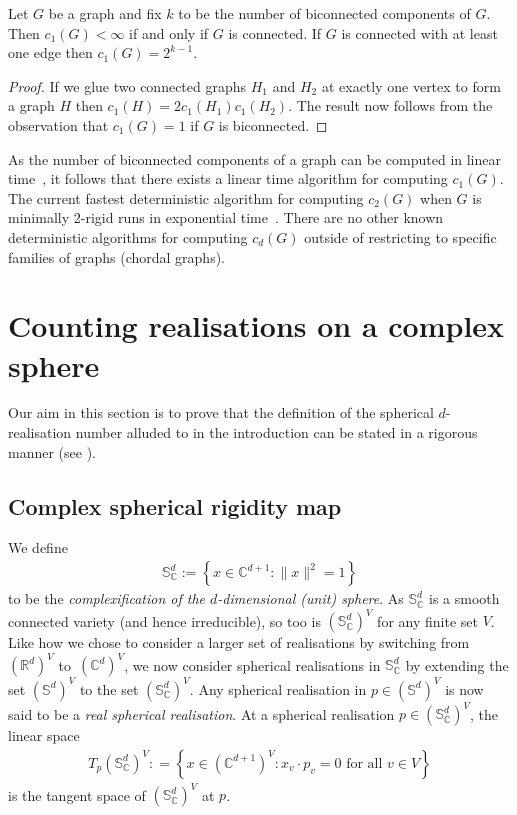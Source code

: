 \begin{proposition}\label{p:1d}
	Let $G$ be a graph and fix $k$ to be the number of biconnected components of $G$.
	Then $c_1(G) < \infty$ if and only if $G$ is connected.
	If $G$ is connected with at least one edge then $c_1(G) = 2^{k-1}$.
\end{proposition}

\begin{proof}
	If we glue two connected graphs $H_1$ and $H_2$ at exactly one vertex to form a graph $H$ then $c_1(H) = 2c_1(H_1)c_1(H_2)$.
	The result now follows from the observation that $c_1(G) = 1$ if $G$ is biconnected.
\end{proof}

As the number of biconnected components of a graph can be computed in linear time~\cite{HopcroftTarjan}, it follows that there exists a linear time algorithm for computing $c_1(G)$.
The current fastest deterministic algorithm for computing $c_2(G)$ when $G$ is minimally 2-rigid runs in exponential time~\cite{PlaneCount}.
There are no other known deterministic algorithms for computing $c_d(G)$ outside of restricting to specific families of graphs (\eg chordal graphs).




\section{Counting realisations on a complex sphere}\label{sec:countsphere}

Our aim in this section is to prove that the definition of the spherical $d$-realisation number alluded to in the introduction can be stated in a rigorous manner (see ).

\subsection{Complex spherical rigidity map}

We define
\begin{align*}
	\mathbb{S}_{\mathbb{C}}^d := \left\{ x \in \mathbb{C}^{d+1} : \|x\|^2=1 \right\}
\end{align*}
to be the \emph{complexification of the $d$-dimensional (unit) sphere}.
As $\mathbb{S}_{\mathbb{C}}^d$ is a smooth connected variety (and hence irreducible),
so too is $(\mathbb{S}_{\mathbb{C}}^{d})^V$ for any finite set $V$.
Like how we chose to consider a larger set of realisations by switching from $(\mathbb{R}^d)^V$ to~$(\mathbb{C}^d)^V$,
we now consider spherical realisations in $\mathbb{S}_\mathbb{C}^d$ by extending the set $(\mathbb{S}^d)^V$ to the set $(\mathbb{S}_{\mathbb{C}}^d)^V$.
Any spherical realisation in $p \in (\mathbb{S}^d)^V$ is now said to be a \emph{real spherical realisation}.
At a spherical realisation $p \in (\mathbb{S}_{\mathbb{C}}^{d})^{V}$,
the linear space
\begin{align*}
	T_p (\mathbb{S}_{\mathbb{C}}^d)^V : =\left\{x \in (\mathbb{C}^{d+1})^V : x_v \cdot p_v=0 \text{ for all } v \in V \right\}
\end{align*}
is the tangent space of $(\mathbb{S}_{\mathbb{C}}^{d})^{V}$ at $p$.

